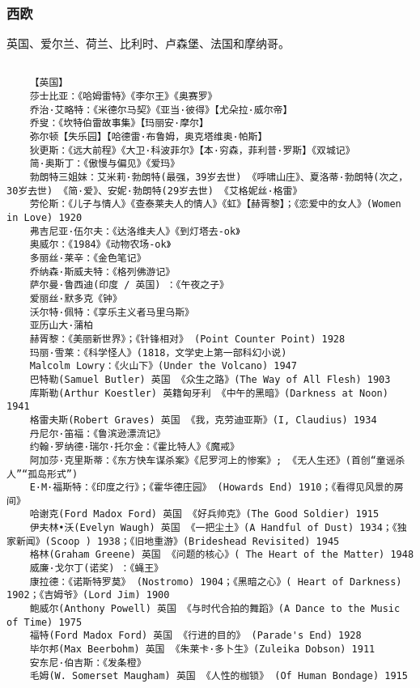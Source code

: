\documentclass[UTF8]{../RepresentationUniverse}
\begin{document}
\subsubsection{西欧}
英国、爱尔兰、荷兰、比利时、卢森堡、法国和摩纳哥。
\begin{lstlisting}

    【英国】
    莎士比亚：《哈姆雷特》《李尔王》《奥赛罗》
    乔治·艾略特：《米德尔马契》《亚当·彼得》【尤朵拉·威尔帝】
    乔叟：《坎特伯雷故事集》【玛丽安·摩尔】
    弥尔顿【失乐园】【哈德雷·布鲁姆，奥克塔维奥·帕斯】
    狄更斯：《远大前程》《大卫·科波菲尔》【本·穷森，菲利普·罗斯】《双城记》
    简·奥斯丁：《傲慢与偏见》《爱玛》
    勃朗特三姐妹：艾米莉·勃朗特(最强，39岁去世) 《呼啸山庄》、夏洛蒂·勃朗特(次之，30岁去世) 《简·爱》、安妮·勃朗特(29岁去世) 《艾格妮丝·格雷》
    劳伦斯：《儿子与情人》《查泰莱夫人的情人》《虹》【赫胥黎】；《恋爱中的女人》(Women in Love) 1920
    弗吉尼亚·伍尔夫：《达洛维夫人》《到灯塔去-ok》
    奥威尔：《1984》《动物农场-ok》
    多丽丝·莱辛：《金色笔记》
    乔纳森·斯威夫特：《格列佛游记》
    萨尔曼·鲁西迪(印度 / 英国) ：《午夜之子》
    爱丽丝·默多克《钟》
    沃尔特·佩特：《享乐主义者马里乌斯》
    亚历山大·蒲柏
    赫胥黎：《美丽新世界》；《针锋相对》 (Point Counter Point) 1928
    玛丽·雪莱：《科学怪人》(1818，文学史上第一部科幻小说) 
    Malcolm Lowry：《火山下》(Under the Volcano) 1947
    巴特勒(Samuel Butler) 英国 《众生之路》(The Way of All Flesh) 1903
    库斯勒(Arthur Koestler) 英籍匈牙利 《中午的黑暗》(Darkness at Noon) 1941
    格雷夫斯(Robert Graves) 英国 《我，克劳迪亚斯》(I, Claudius) 1934
    丹尼尔·笛福：《鲁滨逊漂流记》
    约翰·罗纳德·瑞尔·托尔金：《霍比特人》《魔戒》
    阿加莎·克里斯蒂：《东方快车谋杀案》《尼罗河上的惨案》; 《无人生还》(首创“童谣杀人”“孤岛形式”)
    E·M·福斯特：《印度之行》；《霍华德庄园》 (Howards End) 1910；《看得见风景的房间》
    哈谢克(Ford Madox Ford) 英国 《好兵帅克》(The Good Soldier) 1915
    伊夫林•沃(Evelyn Waugh) 英国 《一把尘土》(A Handful of Dust) 1934；《独家新闻》(Scoop ) 1938；《旧地重游》(Brideshead Revisited) 1945
    格林(Graham Greene) 英国 《问题的核心》( The Heart of the Matter) 1948
    威廉·戈尔丁(诺奖) ：《蝇王》
    康拉德：《诺斯特罗莫》 (Nostromo) 1904；《黑暗之心》( Heart of Darkness) 1902；《吉姆爷》(Lord Jim) 1900
    鲍威尔(Anthony Powell) 英国 《与时代合拍的舞蹈》(A Dance to the Music of Time) 1975
    福特(Ford Madox Ford) 英国 《行进的目的》 (Parade's End) 1928
    毕尔邦(Max Beerbohm) 英国 《朱莱卡·多卜生》(Zuleika Dobson) 1911
    安东尼·伯吉斯：《发条橙》
    毛姆(W. Somerset Maugham) 英国 《人性的枷锁》 (Of Human Bondage) 1915

\end{lstlisting}
\end{document}
